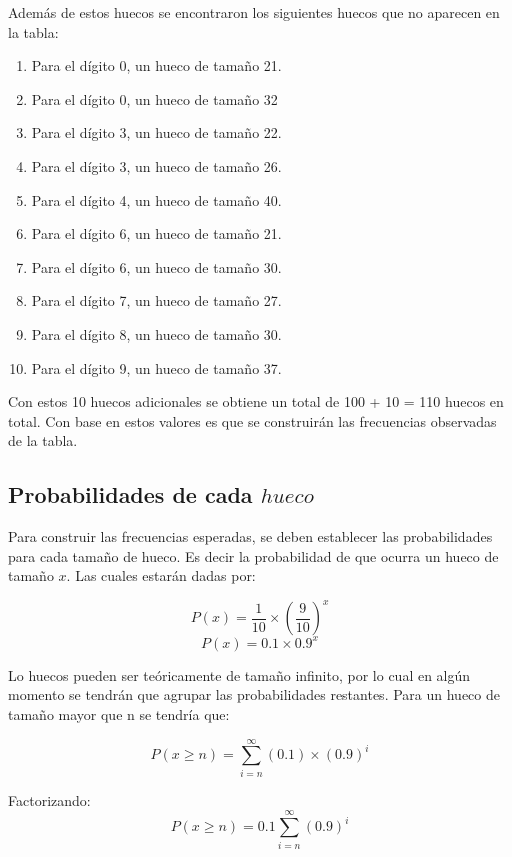 Además de estos huecos se encontraron los siguientes huecos que no aparecen en la tabla:

\begin{enumerate}
\item Para el dígito 0, un hueco de tamaño 21.
\item Para el dígito 0, un hueco de tamaño 32

\item Para el dígito 3, un hueco de tamaño 22.
\item Para el dígito 3, un hueco de tamaño 26.

\item Para el dígito 4, un hueco de tamaño 40.

\item Para el dígito 6, un hueco de tamaño 21.
\item Para el dígito 6, un hueco de tamaño 30.

\item Para el dígito 7, un hueco de tamaño 27.

\item Para el dígito 8, un hueco de tamaño 30.

\item Para el dígito 9, un hueco de tamaño 37.
\end{enumerate}


Con estos 10 huecos adicionales se obtiene un total de 100 + 10 = 110 huecos en total. Con base en estos valores es que se construirán las frecuencias observadas de la tabla.

\subsection{Probabilidades de cada $hueco$}

Para construir las frecuencias esperadas, se deben establecer las probabilidades para cada tamaño de hueco. Es decir la probabilidad de que ocurra un hueco de tamaño $x$. Las cuales estarán dadas por:

$$P(x) = \frac{1}{10} \times (\frac{9}{10})^{x}$$
$$P(x) = 0.1 \times 0.9^{x}$$

Lo huecos pueden ser teóricamente de tamaño infinito, por lo cual en algún momento se tendrán que agrupar las probabilidades restantes. Para un hueco de tamaño mayor que n se tendría que:

$$P(x\geq n) = \sum_{i=n}^\infty (0.1)\times (0.9)^i$$

Factorizando:
$$P(x\geq n) = 0.1 \sum_{i=n}^\infty (0.9)^i$$

